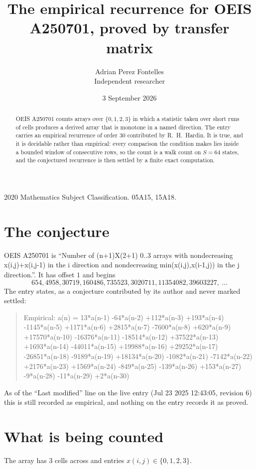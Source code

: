 \documentclass[11pt,a4paper]{article}
\title{The empirical recurrence for OEIS A250701, proved by transfer matrix}
\author{Adrian Perez Fontelles\\ \small Independent researcher}
\date{3 September 2026}
\theoremstyle{plain}
\theoremstyle{definition}
\begin{document}
\maketitle

\begin{abstract}
OEIS A250701 counts arrays over $\{0,1,2,3\}$ in which a statistic taken over short runs
of cells produces a derived array that is monotone in a named direction. The entry carries an
empirical recurrence of order $30$ contributed by R.~H.~Hardin. It is true, and it is
decidable rather than empirical: every comparison the condition makes lies inside a bounded
window of consecutive rows, so the count is a walk count on $S=64$ states, and the
conjectured recurrence is then settled by a finite exact computation.
\end{abstract}

\noindent\small 2020 Mathematics Subject Classification. 05A15, 15A18.\normalsize

\section{The conjecture}

OEIS A250701 is ``Number of (n+1)X(2+1) 0..3 arrays with nondecreasing x(i,j)+x(i,j-1) in the i direction and nondecreasing min(x(i,j),x(i-1,j)) in the j direction.''. It has offset $1$ and begins
\[
654, 4958, 30719, 160486, 735523, 3020711, 11354082, 39603227,\ \dots
\]
The entry states, as a conjecture contributed by its author and never marked settled:
\begin{quote}
Empirical: a(n) = 13*a(n-1) -64*a(n-2) +112*a(n-3) +193*a(n-4) -1145*a(n-5) +1171*a(n-6) +2815*a(n-7) -7600*a(n-8) +620*a(n-9) +17570*a(n-10) -16376*a(n-11) -18514*a(n-12) +37522*a(n-13) +1693*a(n-14) -44011*a(n-15) +19988*a(n-16) +29252*a(n-17) -26851*a(n-18) -9189*a(n-19) +18134*a(n-20) -1082*a(n-21) -7142*a(n-22) +2176*a(n-23) +1569*a(n-24) -849*a(n-25) -139*a(n-26) +153*a(n-27) -9*a(n-28) -11*a(n-29) +2*a(n-30)
\end{quote}
As of the ``Last modified'' line on the live entry (Jul 23 2025 12:43:05, revision 6) this is still
recorded as empirical, and nothing on the entry records it as proved.

\section{What is being counted}

The array has $3$ cells across and entries $x(i,j)\in\{0,1,2,3\}$.
\end{document}

